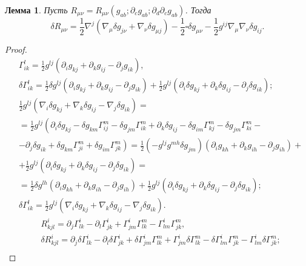 \documentclass[a4paper, 14pt]{scrarticle}
\theoremstyle{Imperial}
\newtheorem{lemm}{Лемма}
\begin{document}
	\begin{lemm}
		Пусть $R_{\mu\nu} = R_{\mu\nu} \left( g_{ab}; \partial_c g_{ab}; \partial_d \partial_c g_{ab} \right)$. Тогда 
		$$\delta R_{\mu\nu}=\frac{1}{2}\nabla^{j}\left(\nabla_{\mu}\delta g_{j\nu}+\nabla_{\nu}\delta g_{\mu j}\right)-\frac{1}{2}\square\delta g_{\mu\nu}-\frac{1}{2}g^{ij}\nabla_{\mu}\nabla_{\nu}\delta g_{ij}.$$
	\end{lemm}
	\begin{proof}
		$$\begin{aligned}
			&\Gamma_{ik}^{l}=\frac{1}{2}g^{lj}\left(\partial_{i}g_{kj}+\partial_{k}g_{ij}-\partial_{j}g_{ik}\right),\\
			&\delta\Gamma_{ik}^{l}=\frac{1}{2}\delta g^{lj}\left(\partial_{i}g_{kj}+\partial_{k}g_{ij}-\partial_{j}g_{ik}\right)+\frac{1}{2}g^{lj}\left(\partial_{i}\delta g_{kj}+\partial_{k}\delta g_{ij}-\partial_{j}\delta g_{ik}\right);\\
			&\frac{1}{2}g^{lj}\left(\nabla_{i}\delta g_{kj}+\nabla_{k}\delta g_{ij}-\nabla_{j}\delta g_{ik}\right)=\\		
			&=\frac{1}{2}g^{lj}\left(\partial_{i}\delta g_{kj}-\delta g_{km}\Gamma_{ij}^{m}-\delta g_{jm}\Gamma_{ik}^{m}+\partial_{k}\delta g_{ij}-\delta g_{im}\Gamma_{kj}^{m}-\delta g_{jm}\Gamma_{ki}^{m} \right. -\\
			&- \left.\partial_{j}\delta g_{ik}+\delta g_{km}\Gamma_{ji}^{m}+\delta g_{im}\Gamma_{jk}^{m}\right)= \frac{1}{2}\left(-g^{lj}g^{mh}\delta g_{jm}\right)\left(\partial_{i}g_{kh}+\partial_{k}g_{ih}-\partial_{j}g_{ih}\right)+\\
			&+\frac{1}{2}g^{lj}\left(\partial_{i}\delta g_{kj}+\partial_{k}\delta g_{ij}-\partial_{j}\delta g_{ik}\right)=\\
			&=\frac{1}{2}\delta g^{lh}\left(\partial_{i}g_{kh}+\partial_{k}g_{ih}-\partial_{j}g_{ih}\right)+\frac{1}{2}g^{lj}\left(\partial_{i}\delta g_{kj}+\partial_{k}\delta g_{ij}-\partial_{j}\delta g_{ik}\right);\\
			&\delta\Gamma_{ik}^{l}=\frac{1}{2}g^{lj}\left(\nabla_{i}\delta g_{kj}+\nabla_{k}\delta g_{ij}-\nabla_{j}\delta g_{ik}\right).
		\end{aligned}$$	
		$$\begin{aligned}
			&R_{kjl}^{i}=\partial_{j}\Gamma_{lk}^{i}-\partial_{l}\Gamma_{jk}^{i}+\Gamma_{jm}^{i}\Gamma_{lk}^{m}-\Gamma_{lm}^{i}\Gamma_{jk}^{m},\\
			&\delta R_{kjl}^{i}=\partial_{j}\delta\Gamma_{lk}^{i}-\partial_{l}\delta\Gamma_{jk}^{i}+\delta\Gamma_{jm}^{i}\Gamma_{lk}^{m}+\Gamma_{jm}^{i}\delta\Gamma_{lk}^{m}-\delta\Gamma_{lm}^{i}\Gamma_{jk}^{m}-\Gamma_{lm}^{i}\delta\Gamma_{jk}^{m};\\

\end{aligned}$$
\end{proof}
\end{document}
